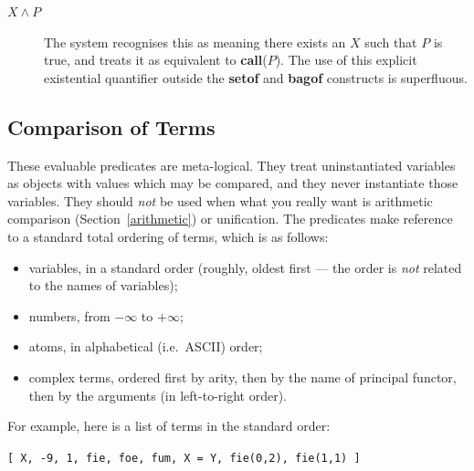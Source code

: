 \begin{description}
\item[$X\wedge P$]
    The system recognises this as meaning there exists an $X$ such
    that $P$ is true, and treats it as equivalent to {\bf call}($P$).
    The use of this explicit existential quantifier outside the {\bf setof}
    and {\bf bagof} constructs is superfluous.
\end{description}

\subsection{Comparison of Terms}\label{comparison_of_terms}
These evaluable predicates are meta-logical.
They treat uninstantiated
variables as objects with values which may be compared, and they never
instantiate those variables.
They should {\em not} be used when what you really want
is arithmetic comparison (Section~\ref{arithmetic}) or unification.
The predicates make reference to a standard total ordering of terms, which is
as follows:
\begin{itemize}
\item variables, in a standard order (roughly, oldest first --- the order is
    {\em not} related to the names of variables);
\item numbers, from $-\infty$ to $+\infty$;
\item atoms, in alphabetical (i.e.\ ASCII) order;
\item complex terms, ordered first by arity, then by the name of principal
    functor, then by the arguments (in left-to-right order).
\end{itemize}

For example, here is a list of terms in the standard order:
\begin{center}
{\tt [ X, -9, 1, fie, foe, fum, X = Y, fie(0,2), fie(1,1) ]}
\end{center}

